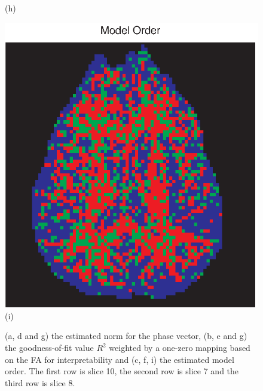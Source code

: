 \documentclass[authoryear,preprint,12pt]{elsarticle}
\begin{document}
\begin{figure}[p]
\begin{center}
\begin{minipage}[]{.30\textwidth}
       (h)
      \end{minipage}
      \begin{minipage}[]{.30\textwidth}
      \centering
      \includegraphics[width=\textwidth]{modelorderchosen2bac.eps}
      (i)
      \end{minipage}
  \end{center}
  \caption{(a, d and g) the estimated norm for the phase vector, (b, e
    and g) the goodness-of-fit value $R^2$ weighted by a one-zero
    mapping based on the FA for interpretability and (c, f, i) the
    estimated model order. The first row is slice 10, the second row
    is slice 7 and the third row is slice 8.}
  \label{fig2} 
\end{figure}
\end{document}
